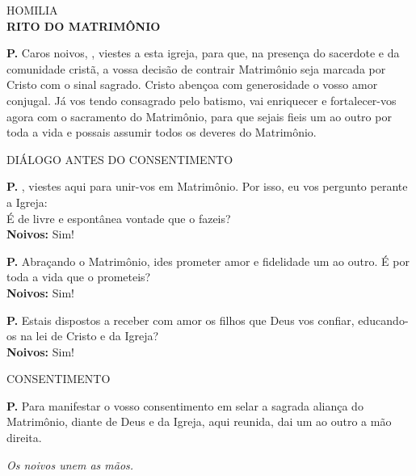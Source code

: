 \documentclass[a5paper,9pt]{memoir}
\begin{document}
{%

\vspace{-0.2cm}
\begin{center}
HOMILIA \\
\vspace{0.2cm}
{\bfseries
RITO DO MATRIM\^ONIO}
\end{center}
\vspace{-0.2cm}


\textbf{P.} Caros noivos, \BG, viestes a esta igreja, para que, na presen\c ca do sacerdote e da comunidade crist\~a, a vossa decis\~ao de contrair Matrim\^onio seja marcada por Cristo com o sinal sagrado. Cristo aben\c coa com generosidade o vosso amor conjugal. J\'a vos tendo consagrado pelo batismo, vai enriquecer e fortalecer-vos agora com o sacramento do Matrim\^onio, para que sejais fieis um ao outro por toda a vida e possais assumir todos os deveres do Matrim\^onio.

\begin{center}
DI\'ALOGO ANTES DO CONSENTIMENTO
\end{center}

\textbf{P.} \BG, viestes aqui para unir-vos em Matrimônio. Por isso, eu vos pergunto perante a Igreja:\\\'E de livre e espont\^anea vontade que o fazeis?\\
\textbf{Noivos:} Sim!

\textbf{P.} Abra\c cando o Matrim\^onio, ides prometer amor e fidelidade um ao outro. \'E por toda a vida que o prometeis?\\
\textbf{Noivos:} Sim!

\textbf{P.} Estais dispostos a receber com amor os filhos que Deus vos confiar, educando-os na lei de Cristo e da Igreja?\\
\textbf{Noivos:} Sim!

\pagebreak
\begin{center}
CONSENTIMENTO
\end{center}

\textbf{P.} Para manifestar o vosso consentimento em selar a sagrada alian\c ca do Matrim\^onio, diante de Deus e da Igreja, aqui reunida, dai um ao outro a m\~ao direita.

{\itshape \color{mygray}Os noivos unem as mãos.}

}
\end{document}
